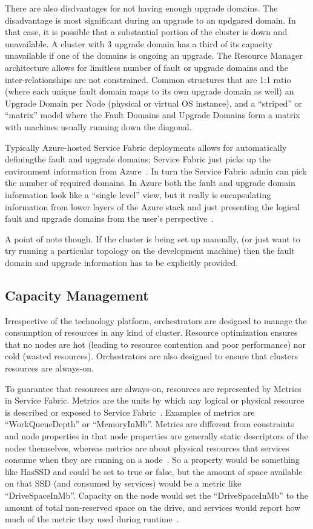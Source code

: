 There are also disdvantages for not having enough upgrade domains.
The disadvantage is most significant during an upgrade to an updgared
domain. In that case, it is possible that a substantial portion
of the cluster is down and unavailable. A cluster with 3 upgrade domain 
has a third of its
capacity unavailable if one of the domains is ongoing an upgrade. 
The Resource Manager architecture allows for limitless number of fault or 
upgrade domains
and the inter-relationships are not constrained. Common structures that 
are 1:1 ratio (where each
unique fault domain maps to its own upgrade domain as well) an Upgrade
Domain per Node (physical or virtual OS instance), and a “striped” or
“matrix” model where the Fault Domains and Upgrade Domains form a
matrix with machines usually running down the diagonal.

Typically Azure-hosted Service Fabric deployments allows for
automatically definingthe fault and upgrade domains; Service Fabric
just picks up the environment information from
Azure~\cite{hid-sp18-501-fig2and3}. In turn the Service Fabric admin
can pick the number of required domains. In Azure both the fault and
upgrade domain information look like a “single level” view, but it
really is encapsulating information from lower layers of the Azure
stack and just presenting the logical fault and upgrade domains from
the user’s perspective~\cite{hid-sp18-501-fig2and3}.

A point of note though. If the cluster is being set up manually, (or
just want to try running a particular topology on the development
machine) then the fault domain and upgrade information has to be
explicitly provided.

\subsection{Capacity Management}
Irrespective of the technology platform, orchestrators are designed to
manage the consumption of resources in any kind of cluster. Resource
optimization ensures that no nodes are hot (leading to resource
contention and poor performance) nor cold (wasted
resources). Orchestrators are also designed to ensure that clusters
resources are always-on.

To guarantee that resources are always-on, resources are represented
by Metrics in Service Fabric. Metrics are the units by which any
logical or physical resource is described or exposed to Service
Fabric~\cite{hid-sp18-501-fig2and3}. Examples of metrics are
“WorkQueueDepth” or “MemoryInMb”. Metrics are different from
constraints and node properties in that node properties are generally
static descriptors of the nodes themselves, whereas metrics are about
physical resources that services consume when they are running on a
node~\cite{hid-sp18-501-fig2and3}.  So a property would be something
like HasSSD and could be set to true or false, but the amount of space
available on that SSD (and consumed by services) would be a metric
like “DriveSpaceInMb”. Capacity on the node would set the
“DriveSpaceInMb” to the amount of total non-reserved space on the
drive, and services would report how much of the metric they used
during runtime~\cite{hid-sp18-501-fig2and3}.


